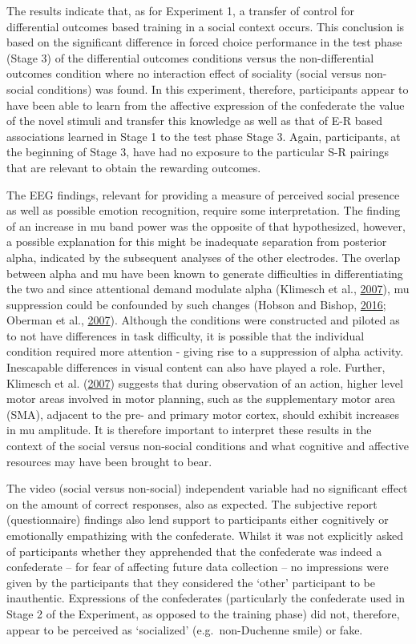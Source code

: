 \documentclass[]{elsarticle} %
\begin{document}
The results indicate that, as for Experiment 1, a transfer of control
for differential outcomes based training in a social context occurs.
This conclusion is based on the significant difference in forced choice
performance in the test phase (Stage 3) of the differential outcomes
conditions versus the non-differential outcomes condition where no
interaction effect of sociality (social versus non-social conditions)
was found. In this experiment, therefore, participants appear to have
been able to learn from the affective expression of the confederate the
value of the novel stimuli and transfer this knowledge as well as that
of E-R based associations learned in Stage 1 to the test phase Stage 3.
Again, participants, at the beginning of Stage 3, have had no exposure
to the particular S-R pairings that are relevant to obtain the rewarding
outcomes.

The EEG findings, relevant for providing a measure of perceived social
presence as well as possible emotion recognition, require some
interpretation. The finding of an increase in mu band power was the
opposite of that hypothesized, however, a possible explanation for this
might be inadequate separation from posterior alpha, indicated by the
subsequent analyses of the other electrodes. The overlap between alpha
and mu have been known to generate difficulties in differentiating the
two and since attentional demand modulate alpha (Klimesch et al.,
\protect\hyperlink{ref-klimesch2007eeg}{2007}), mu suppression could be
confounded by such changes (Hobson and Bishop,
\protect\hyperlink{ref-hobson2016mu}{2016}; Oberman et al.,
\protect\hyperlink{ref-oberman2007human}{2007}). Although the conditions
were constructed and piloted as to not have differences in task
difficulty, it is possible that the individual condition required more
attention - giving rise to a suppression of alpha activity. Inescapable
differences in visual content can also have played a role. Further,
Klimesch et al. (\protect\hyperlink{ref-klimesch2007eeg}{2007}) suggests
that during observation of an action, higher level motor areas involved
in motor planning, such as the supplementary motor area (SMA), adjacent
to the pre- and primary motor cortex, should exhibit increases in mu
amplitude. It is therefore important to interpret these results in the
context of the social versus non-social conditions and what cognitive
and affective resources may have been brought to bear.

The video (social versus non-social) independent variable had no
significant effect on the amount of correct responses, also as expected.
The subjective report (questionnaire) findings also lend support to
participants either cognitively or emotionally empathizing with the
confederate. Whilst it was not explicitly asked of participants whether
they apprehended that the confederate was indeed a confederate -- for
fear of affecting future data collection -- no impressions were given by
the participants that they considered the `other' participant to be
inauthentic. Expressions of the confederates (particularly the
confederate used in Stage 2 of the Experiment, as opposed to the
training phase) did not, therefore, appear to be perceived as
`socialized' (e.g.~non-Duchenne smile) or fake.
\end{document}

